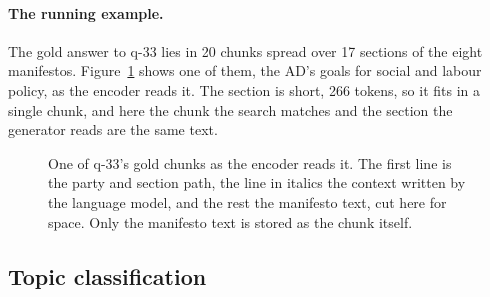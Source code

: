 \paragraph{The running example.} The gold answer to q-33 lies in 20 chunks
spread over 17 sections of the eight manifestos.
Figure~\ref{fig:q33-chunk} shows one of them, the AD's goals for social and
labour policy, as the encoder reads it. The section is short, 266 tokens, so
it fits in a single chunk, and here the chunk the search matches and the
section the generator reads are the same text.

\begin{figure}[htbp]
    \centering
    \caption[A chunk as the encoder reads it]{One of q-33's gold chunks as the
    encoder reads it. The first line is the party and section path, the line in
    italics the context written by the language model, and the rest the
    manifesto text, cut here for space. Only the manifesto text is stored as
    the chunk itself.}
    \label{fig:q33-chunk}
\end{figure}

\subsection{Topic classification} \label{subsec:classification}

